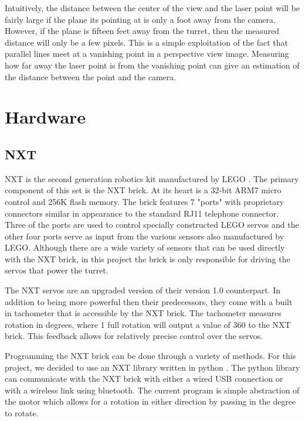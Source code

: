 \documentclass[10pt,twocolumn,letterpaper]{article}
\begin{document}
Intuitively, the distance between the center of the view and the laser point will be fairly large if the plane its pointing at is only a foot away from the camera.  However, if the plane is fifteen feet away from the turret, then the measured distance will only be a few pixels.  This is a simple exploitation of the fact that parallel lines meet at a vanishing point in a perspective view image. Measuring how far away the laser point is from the vanishing point can give an estimation of the distance between the point and the camera.

\section{Hardware}

\subsection{NXT}

NXT is the second generation robotics kit manufactured by LEGO \cite{nxt}. The primary component of this set is the NXT brick. At its heart is a 32-bit ARM7 micro control and 256K flash memory. The brick features 7 "ports" with proprietary connectors similar in appearance to the standard RJ11 telephone connector. Three of the ports are used to control specially constructed LEGO servos and the other four ports serve as input from the various sensors also manufactured by LEGO. Although there are a wide variety of sensors that can be used directly with the NXT brick, in this project the brick is only responsible for driving the servos that power the turret.

The NXT servos are an upgraded version of their version 1.0 counterpart. In addition to being more powerful then their predecessors, they come with a built in tachometer that is accessible by the NXT brick. The tachometer measures rotation in degrees, where 1 full rotation will output a value of 360 to the NXT brick. This feedback allows for relatively precise control over the servos.

Programming the NXT brick can be done through a variety of methods. For this project, we decided to use an NXT library written in python \cite{pynxt}. The python library can communicate with the NXT brick with either a wired USB connection or with a wireless link using bluetooth. The current program is simple abstraction of the motor which allows for a rotation in either direction by passing in the degree to rotate.
\end{document}
